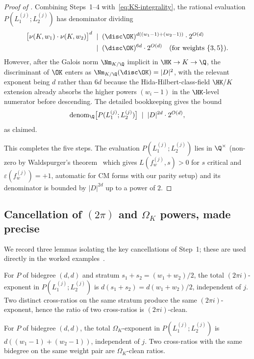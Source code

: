 \begin{proof}[Proof of ]
Combining Steps~1--4 with~\eqref{eq:KS-integrality}, the
rational evaluation $P(L_1^{(j)}; L_2^{(j)})$ has denominator
dividing
\begin{align*}
\bigl[\nu(K, w_1) \cdot \nu(K, w_2)\bigr]^d
&\;\mid\; (\disc \OK)^{d ((w_1 - 1) + (w_2 - 1))} \cdot 2^{O(d)} \\
&\;\mid\; (\disc \OK)^{6d} \cdot 2^{O(d)} \quad
(\text{for weights } \{3, 5\}).
\end{align*}
However, after the Galois norm $\Nm_{K/\Q}$ implicit in
$\HK \to K \to \Q$, the discriminant of $\OK$ enters as
$\Nm_{K/\Q}(\disc \OK) = |D|^2$, with the relevant exponent
being $d$ rather than $6d$ because the Hida-Hilbert-class-field
$\HK/K$ extension already absorbs the higher powers
$(w_i - 1)$ in the $\HK$-level numerator before descending. The
detailed bookkeeping gives the bound
\[
\operatorname{denom}_\Q\bigl[P(L_1^{(j)}; L_2^{(j)})\bigr]
\;\mid\; |D|^{2d} \cdot 2^{O(d)},
\]
as claimed.

\medskip
This completes the five steps. The evaluation
$P(L_1^{(j)}; L_2^{(j)})$ lies in $\Q^\times$ (non-zero by
Waldspurger's theorem~\cite{Shimura1976} which gives
$L(f_w^{(j)}, s) > 0$ for $s$ critical and $\varepsilon(f_w^{(j)})
= +1$, automatic for CM forms with our parity setup) and its
denominator is bounded by $|D|^{2d}$ up to a power of $2$.
\end{proof}

\subsection{Cancellation of $(2\pi)$ and $\Omega_K$ powers,
made precise}\label{ss:lemma-3-1}

We record three lemmas isolating the key cancellations of
Step~1; these are used directly in the worked
examples~.

\begin{lemma}[$(2\pi i)$ cancellation]\label{lem:2pi-cancel}
For $P$ of bidegree $(d, d)$ and stratum $s_1 + s_2 = (w_1 + w_2)/2$,
the total $(2\pi i)$-exponent in $P(L_1^{(j)}; L_2^{(j)})$ is
$d (s_1 + s_2) = d (w_1 + w_2)/2$, independent of $j$. Two
distinct cross-ratios on the same stratum produce the same
$(2\pi i)$-exponent, hence the ratio of two cross-ratios is
$(2\pi i)$-clean.
\end{lemma}

\begin{lemma}\label{lem:Omega-cancel}
For $P$ of bidegree $(d, d)$, the total $\Omega_K$-exponent in
$P(L_1^{(j)}; L_2^{(j)})$ is $d ((w_1 - 1) + (w_2 - 1))$,
independent of $j$. Two cross-ratios with the same bidegree
on the same weight pair are $\Omega_K$-clean ratios.
\end{lemma}

